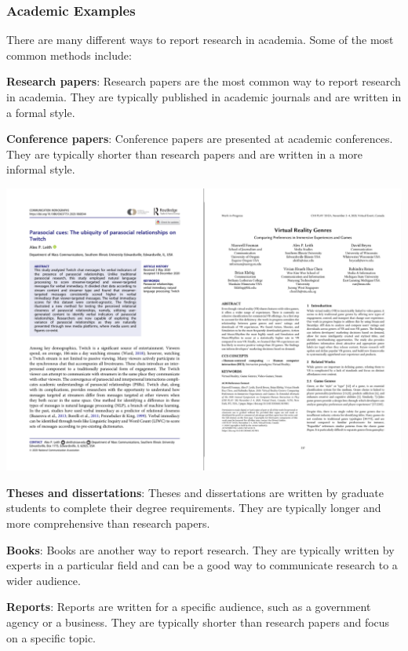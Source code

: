 \documentclass[
]{book}
\begin{document}
\subsubsection*{Academic Examples}\label{academic-examples}

There are many different ways to report research in academia. Some of the most common methods include:

\textbf{Research papers}: Research papers are the most common way to report research in academia. They are typically published in academic journals and are written in a formal style.

\textbf{Conference papers}: Conference papers are presented at academic conferences. They are typically shorter than research papers and are written in a more informal style.

\includegraphics[width=1\linewidth,height=\textheight,keepaspectratio]{images/papers.png}

\textbf{Theses and dissertations}: Theses and dissertations are written by graduate students to complete their degree requirements. They are typically longer and more comprehensive than research papers.

\textbf{Books}: Books are another way to report research. They are typically written by experts in a particular field and can be a good way to communicate research to a wider audience.

\textbf{Reports}: Reports are written for a specific audience, such as a government agency or a business. They are typically shorter than research papers and focus on a specific topic.
\end{document}
